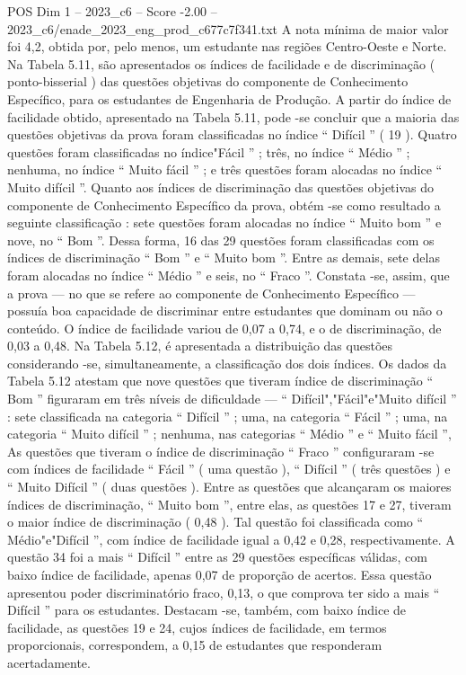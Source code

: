 \begin{textsample}{POS Dim 1 – 2023\_c6 – Score -2.00 – 2023\_c6/enade\_2023\_eng\_prod\_c677c7f341.txt}
A nota mínima de maior valor foi 4,2, obtida por, pelo menos, um estudante nas regiões Centro-Oeste e Norte.
Na Tabela 5.11, são apresentados os índices de facilidade e de discriminação ( ponto-bisserial ) das questões objetivas do componente de Conhecimento Específico, para os estudantes de Engenharia de Produção.
A partir do índice de facilidade obtido, apresentado na Tabela 5.11, pode -se concluir que a maioria das questões objetivas da prova foram classificadas no índice “ Difícil ” ( 19 ).
Quatro questões foram classificadas no índice"Fácil ” ; três, no índice “ Médio ” ; nenhuma, no índice “ Muito fácil ” ; e três questões foram alocadas no índice “ Muito difícil ”.
Quanto aos índices de discriminação das questões objetivas do componente de Conhecimento Específico da prova, obtém -se como resultado a seguinte classificação : sete questões foram alocadas no índice “ Muito bom ” e nove, no “ Bom ”.
Dessa forma, 16 das 29 questões foram classificadas com os índices de discriminação “ Bom ” e “ Muito bom ”.
Entre as demais, sete delas foram alocadas no índice “ Médio ” e seis, no “ Fraco ”.
Constata -se, assim, que a prova — no que se refere ao componente de Conhecimento Específico — possuía boa capacidade de discriminar entre estudantes que dominam ou não o conteúdo.
O índice de facilidade variou de 0,07 a 0,74, e o de discriminação, de 0,03 a 0,48.
Na Tabela 5.12, é apresentada a distribuição das questões considerando -se, simultaneamente, a classificação dos dois índices.
Os dados da Tabela 5.12 atestam que nove questões que tiveram índice de discriminação “ Bom ” figuraram em três níveis de dificuldade — “ Difícil","Fácil"e"Muito difícil ” : sete classificada na categoria “ Difícil ” ; uma, na categoria “ Fácil ” ; uma, na categoria “ Muito difícil ” ; nenhuma, nas categorias “ Médio ” e “ Muito fácil ”, As questões que tiveram o índice de discriminação “ Fraco ” configuraram -se com índices de facilidade “ Fácil ” ( uma questão ), “ Difícil ” ( três questões ) e “ Muito Difícil ” ( duas questões ).
Entre as questões que alcançaram os maiores índices de discriminação, “ Muito bom ”, entre elas, as questões 17 e 27, tiveram o maior índice de discriminação ( 0,48 ).
Tal questão foi classificada como “ Médio"e"Difícil ”, com índice de facilidade igual a 0,42 e 0,28, respectivamente.
A questão 34 foi a mais “ Difícil ” entre as 29 questões específicas válidas, com baixo índice de facilidade, apenas 0,07 de proporção de acertos.
Essa questão apresentou poder discriminatório fraco, 0,13, o que comprova ter sido a mais “ Difícil ” para os estudantes.
Destacam -se, também, com baixo índice de facilidade, as questões 19 e 24, cujos índices de facilidade, em termos proporcionais, correspondem, a 0,15 de estudantes que responderam acertadamente.

\end{textsample}
